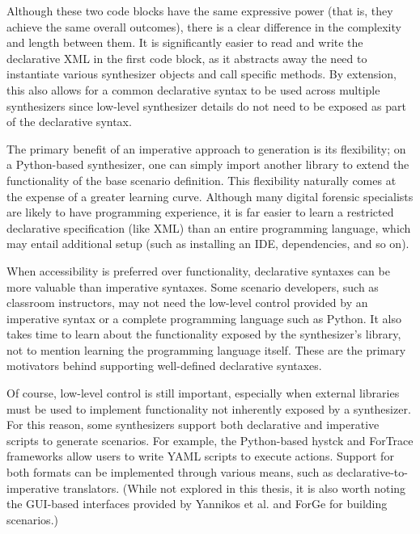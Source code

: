 \documentclass[letterpaper,12pt]{report}
\begin{document}
Although these two code blocks have the same expressive power (that is,
they achieve the same overall outcomes), there is a clear difference in
the complexity and length between them. It is significantly easier to
read and write the declarative XML in the first code block, as it
abstracts away the need to instantiate various synthesizer objects and
call specific methods. By extension, this also allows for a common
declarative syntax to be used across multiple synthesizers since
low-level synthesizer details do not need to be exposed as part of the
declarative syntax.

The primary benefit of an imperative approach to generation is its
flexibility; on a Python-based synthesizer, one can simply import
another library to extend the functionality of the base scenario
definition. This flexibility naturally comes at the expense of a greater
learning curve. Although many digital forensic specialists are likely to
have programming experience, it is far easier to learn a restricted
declarative specification (like XML) than an entire programming
language, which may entail additional setup (such as installing an IDE,
dependencies, and so on).

When accessibility is preferred over functionality, declarative syntaxes
can be more valuable than imperative syntaxes. Some scenario developers,
such as classroom instructors, may not need the low-level control
provided by an imperative syntax or a complete programming language such
as Python. It also takes time to learn about the functionality exposed
by the synthesizer's library, not to mention learning the programming
language itself. These are the primary motivators behind supporting
well-defined declarative syntaxes.

Of course, low-level control is still important, especially when
external libraries must be used to implement functionality not
inherently exposed by a synthesizer. For this reason, some synthesizers
support both declarative and imperative scripts to generate scenarios.
For example, the Python-based hystck and ForTrace frameworks
\cite{gobelNovelApproachGenerating2020,gobelForTraceHolisticForensic2022}
allow users to write YAML scripts to execute actions. Support for both
formats can be implemented through various means, such as
declarative-to-imperative translators. (While not explored in this
thesis, it is also worth noting the GUI-based interfaces provided by
Yannikos et al. \cite{yannikosDataCorporaDigital2014} and ForGe
\cite{vistiAutomaticCreationComputer2015} for building scenarios.)
\end{document}
